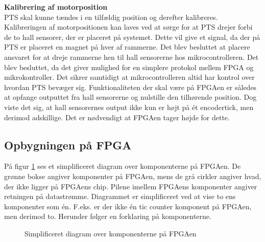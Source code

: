 \textbf{Kalibrering af motorposition}\\
PTS skal kunne tændes i en tilfældig position og derefter kalibreres.
Kalibreringen af motorpositionen kan laves ved at sørge for at PTS drejer forbi 
de to hall sensorer, der er placeret på systemet. Dette vil give et signal, da 
der på PTS er placeret en magnet på hver af rammerne.
Det blev besluttet at placere ansvaret for at dreje rammerne hen til hall 
sensorerne hos mikrocontrolleren. Det blev besluttet, da det giver mulighed for 
en simplere protokol mellem FPGA og mikrokontroller. Det sikrer samtidigt at mikrocontrolleren 
altid har kontrol over hvordan PTS bevæger sig.
Funktionaliteten der skal være på FPGAen er således at opfange outputtet fra 
hall sensorerne og nulstille den tilhørende position.
Dog viste det sig, at hall sensorernes output ikke kun er højt på ét encodertick, 
men derimod adskillige. Det er nødvendigt at FPGAen tager højde for 
dette.

\subsection{Opbygningen på FPGA}
På figur \ref{fig:FPGA_blok} ses et simplificeret diagram over komponenterne på FPGAen. 
De grønne bokse angiver komponenter på FPGAen, mens de grå cirkler angiver hvad, der ikke ligger på 
FPGAens chip. Pilene imellem FPGAens komponenter angiver retningen på 
datastrømme. Diagrammet er simplificeret ved at vise to ens komponenter som én. 
F.eks. er der ikke én tic counter komponent på FPGAen, men derimod to.
Herunder følger en forklaring på komponenterne.

\begin{figure}[!th]
\centering
\begin{tikzpicture}[node distance = 5 cm,scale=1]

\end{tikzpicture}
\caption[Diagram over FPGA komponenter]{Simplificeret diagram over komponenterne på FPGAen}
\label{fig:FPGA_blok}
\end{figure}


